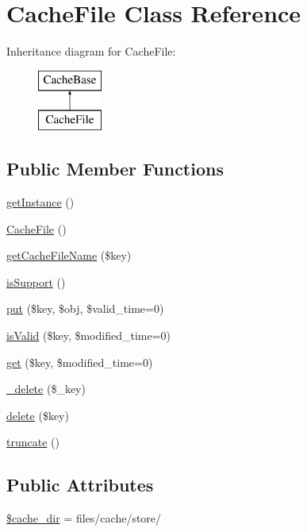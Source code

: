\hypertarget{classCacheFile}{}\section{Cache\+File Class Reference}
\label{classCacheFile}
Inheritance diagram for Cache\+File\+:\begin{figure}[H]
\begin{center}
\leavevmode
\includegraphics[height=2.000000cm]{classCacheFile}
\end{center}
\end{figure}
\subsection*{Public Member Functions}
\begin{DoxyCompactItemize}
\item 
\hyperlink{classCacheFile_a5389ea809c31aed387c12eb37b2677b8}{get\+Instance} ()
\item 
\hyperlink{classCacheFile_a989f8b586fb83812f1c0ab1e3f2e302a}{Cache\+File} ()
\item 
\hyperlink{classCacheFile_a15ca23dea98604dc2e6d067f9ce48242}{get\+Cache\+File\+Name} (\$key)
\item 
\hyperlink{classCacheFile_ab3982221be8af4a74302b648831d1376}{is\+Support} ()
\item 
\hyperlink{classCacheFile_a1883472236dececa9215546dae2733cc}{put} (\$key, \$obj, \$valid\+\_\+time=0)
\item 
\hyperlink{classCacheFile_ab154224d403ed4199885414cfa34d713}{is\+Valid} (\$key, \$modified\+\_\+time=0)
\item 
\hyperlink{classCacheFile_aa5834aeb4fce61fe5e99d06fe3795d84}{get} (\$key, \$modified\+\_\+time=0)
\item 
\hyperlink{classCacheFile_a59058fb815de83e25ec107fec5dff2d2}{\+\_\+delete} (\$\+\_\+key)
\item 
\hyperlink{classCacheFile_aae765f3dbe6d888b5e272c247f696518}{delete} (\$key)
\item 
\hyperlink{classCacheFile_a990fc76da2501ced9077aff881350f7f}{truncate} ()
\end{DoxyCompactItemize}
\subsection*{Public Attributes}
\begin{DoxyCompactItemize}
\item 
\hyperlink{classCacheFile_a39d0574a28dd55f6b312811f411f2f51}{\$cache\+\_\+dir} = \textquotesingle{}files/cache/store/\textquotesingle{}
\end{DoxyCompactItemize}


